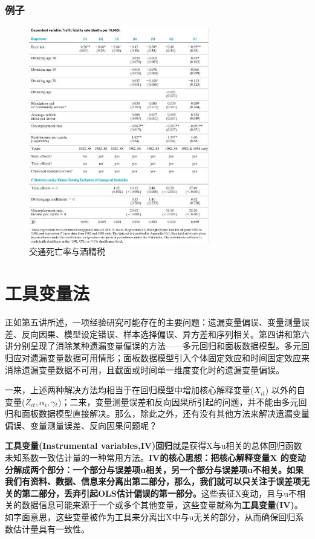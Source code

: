 \documentclass[cn,12pt,math=newtx,citestyle=gb7714-2015,bibstyle=gb7714-2015]{elegantbook}
\begin{document}
\subsection{例子}
\begin{figure}[htbp]
	\centering
	\includegraphics[width=0.7\textwidth]{results.jpg}
	\caption{交通死亡率与酒精税}\label{fig:digit}
\end{figure}
	
	\chapter{工具变量法}
	正如第五讲所述，一项经验研究可能存在的主要问题：遗漏变量偏误、变量测量误差、反向因果、模型设定错误、样本选择偏误、异方差和序列相关。第四讲和第六讲分别呈现了消除某种遗漏变量偏误的方法——多元回归和面板数据模型。多元回归应对遗漏变量数据可用情形；面板数据模型引入个体固定效应和时间固定效应来消除遗漏变量数据不可用，且截面或时间单一维度变化时的遗漏变量偏误。
	
	一来，上述两种解决方法均相当于在回归模型中增加核心解释变量($X_{it}$) 以外的自变量($Z_{it},\alpha{_i},\gamma{_t}$)；二来，变量测量误差和反向因果所引起的问题，并不能由多元回归和面板数据模型直接解决。那么，除此之外，还有没有其他方法来解决遗漏变量偏误、变量测量误差、反向因果问题呢？
	
	\textbf{工具变量(Instrumental variables,IV)回归}就是获得X与u相关的总体回归函数未知系数一致估计量的一种常用方法。\textbf{IV的核心思想：把核心解释变量X 的变动分解成两个部分：一个部分与误差项u相关，另一个部分与误差项u不相关。如果我们有资料、数据、信息来分离出第二部分，那么，我们就可以只关注于误差项无关的第二部分，丢弃引起OLS估计偏误的第一部分。}这些表征X变动，且与u不相关的数据信息可能来源于一个或多个其他变量，这些变量就称为\textbf{工具变量(IV)}。 如字面意思，这些变量被作为工具来分离出X中与u无关的部分，从而确保回归系数估计量具有一致性。
	
\end{document}
